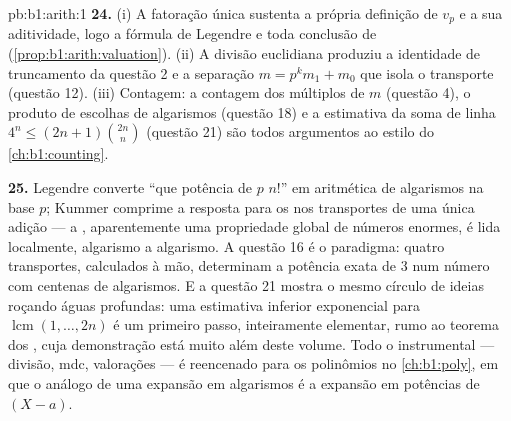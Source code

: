 \begin{solution}{pb:b1:arith:1}
\textbf{24.} (i) A fatoração única sustenta a própria
definição de $v_p$ e a sua aditividade, logo a fórmula de Legendre
e toda conclusão de 
(\cref{prop:b1:arith:valuation}). (ii) A divisão euclidiana produziu
a identidade de truncamento da questão 2 e a separação $m = p^km_1 +
m_0$ que isola o transporte (questão 12). (iii) Contagem: a
contagem dos múltiplos de $m$ (questão 4), o produto de escolhas de
algarismos (questão 18) e a estimativa da soma de linha $4^n \leq
(2n+1)\binom{2n}n$ (questão 21) são todos
argumentos ao estilo do \cref{ch:b1:counting}.

\textbf{25.} Legendre converte ``que potência de $p$ 
$n!$'' em aritmética de algarismos na base $p$; Kummer comprime a
resposta para os  nos transportes de uma única
adição --- a , aparentemente uma propriedade global de
números enormes, é lida localmente, algarismo a algarismo. A questão 16
é o paradigma: quatro transportes, calculados à mão, determinam a
potência exata de $3$ num número com centenas de algarismos. E a
questão 21 mostra o mesmo círculo de ideias roçando águas profundas: uma
estimativa inferior exponencial para $\operatorname{lcm}(1, \dots, 2n)$ é
um primeiro passo, inteiramente elementar, rumo ao teorema dos , cuja demonstração está muito além deste volume. Todo o
instrumental --- divisão, mdc, valorações --- é reencenado para os
polinômios no \cref{ch:b1:poly}, em que o análogo de uma expansão em
algarismos é a expansão em potências de $(X - a)$.
\end{solution}
